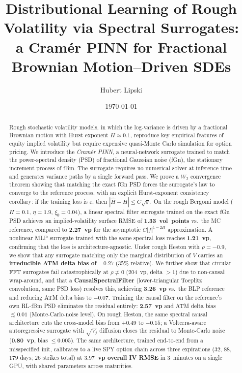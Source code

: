 \documentclass[11pt,a4paper]{article}
\begin{document}
\title{Distributional Learning of Rough Volatility via Spectral Surrogates:\\
    a Cramér PINN for Fractional Brownian Motion--Driven SDEs}

\author{Hubert Lipski}
\date{\today}
\maketitle

\begin{abstract}
Rough stochastic volatility models, in which the log-variance is driven by a
fractional Brownian motion with Hurst exponent $H \approx 0.1$, reproduce
key empirical features of equity implied volatility but require expensive
quasi-Monte Carlo simulation for option pricing. We introduce the
\emph{Cramér PINN}, a neural-network surrogate trained to match the
power-spectral density (PSD) of fractional Gaussian noise (fGn), the
stationary increment process of fBm. The surrogate requires no
numerical solver at inference time and generates variance paths by a
single forward pass. We prove a $W_2$ convergence theorem showing that
matching the exact fGn PSD forces the surrogate's law to converge to the
reference process, with an explicit Hurst-exponent consistency corollary:
if the training loss is $\varepsilon$, then $|\hat{H} - H| \leq C\sqrt{\varepsilon}$.
On the rough Bergomi model ($H=0.1$, $\eta=1.9$, $\xi_0=0.04$), a linear
spectral filter surrogate trained on the exact fGn PSD achieves an
implied-volatility surface RMSE of \textbf{1.33~vol~points} vs.\ the MC
reference, compared to \textbf{2.27~vp} for the asymptotic
$C|f|^{1-2H}$ approximation. A nonlinear MLP surrogate trained with
the same spectral loss reaches \textbf{1.21~vp}, confirming that the loss
is architecture-agnostic. Under rough Heston with $\rho=-0.9$, we show that any surrogate matching
only the marginal distribution of $V$ carries an \textbf{irreducible ATM
delta bias of $-0.27$} ($35\%$ relative). We further show that circular
FFT surrogates fail catastrophically at $\rho\neq 0$ (204~vp, delta $>1$)
due to non-causal wrap-around, and that a \textbf{CausalSpectralFilter}
(lower-triangular Toeplitz convolution, same PSD loss) resolves this,
achieving \textbf{3.26~vp} vs.\ the BLP reference and reducing ATM delta
bias to $-0.07$. Training the causal filter on the reference's own
RL-fBm PSD eliminates the residual entirely: \textbf{2.57~vp} and ATM
delta bias $\lesssim 0.01$ (Monte-Carlo-noise level). On rough Heston,
the same spectral causal architecture cuts the cross-model bias from
$+0.49$ to $-0.15$; a Volterra-aware autoregressive surrogate with
$\sqrt{V_j}$ diffusion closes the residual to Monte-Carlo noise
(\textbf{0.80~vp}, bias $\leq 0.005$). The same architecture, trained
end-to-end from a misspecified init, calibrates to a live SPY option
chain across three expirations ($32$, $88$, $179$ days; $26$ strikes
total) at \textbf{$3.97$~vp overall IV RMSE} in $3$~minutes on a
single GPU, with shared parameters across maturities.
\end{abstract}
\end{document}
